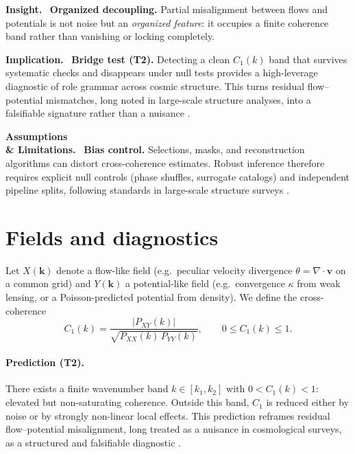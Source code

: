 \documentclass[12pt,a4paper,oneside]{scrreprt}
\newenvironment{insight}{\par\vspace{0.5em}\noindent\textbf{Insight.}\ }{\par\vspace{0.5em}}
\newenvironment{implication}{\par\vspace{0.5em}\noindent\textbf{Implication.}\ }{\par\vspace{0.5em}}
\newenvironment{limitation}{\par\vspace{0.5em}\noindent\textbf{Assumptions \\ \& Limitations.}\ }{\par\vspace{0.5em}}
\begin{document}
\begin{insight}
\textbf{Organized decoupling.} 
Partial misalignment between flows and potentials is not noise but an 
\emph{organized feature}: it occupies a finite coherence band rather than 
vanishing or locking completely.
\end{insight}

\begin{implication}
\textbf{Bridge test (T2).} 
Detecting a clean $C_1(k)$ band that survives systematic checks 
and disappears under null tests provides a high-leverage diagnostic 
of role grammar across cosmic structure. 
This turns residual flow–potential mismatches, long noted in large-scale 
structure analyses, into a falsifiable signature rather than a nuisance 
\citep{Peebles1980LSS,ColesLucchin2002}.
\end{implication}

\begin{limitation}
\textbf{Bias control.} 
Selections, masks, and reconstruction algorithms can distort cross-coherence 
estimates. 
Robust inference therefore requires explicit null controls (phase shuffles, 
surrogate catalogs) and independent pipeline splits, following standards 
in large-scale structure surveys \citep{SDSS2006Eisenstein,Planck2018Cosmo}.
\end{limitation}

\section{Fields and diagnostics}\label{sec:lss-fields}

Let $X(\mathbf k)$ denote a flow-like field (e.g.\ peculiar velocity divergence 
$\theta = \nabla \!\cdot \mathbf v$ on a common grid) and $Y(\mathbf k)$ a 
potential-like field (e.g.\ convergence $\kappa$ from weak lensing, 
or a Poisson-predicted potential from density). 
We define the cross-coherence
\begin{equation}
C_1(k) = \frac{|P_{XY}(k)|}{\sqrt{P_{XX}(k)\,P_{YY}(k)}}, 
\qquad 0 \leq C_1(k) \leq 1.
\end{equation}

\paragraph{Prediction (T2).} 
There exists a finite wavenumber band $k \in [k_1,k_2]$ with 
$0 < C_1(k) < 1$: elevated but non-saturating coherence. 
Outside this band, $C_1$ is reduced either by noise 
or by strongly non-linear local effects. 
This prediction reframes residual flow–potential misalignment, 
long treated as a nuisance in cosmological surveys, 
as a structured and falsifiable diagnostic 
\citep{Dekel1999LSS,Planck2018Cosmo}.
\end{document}
